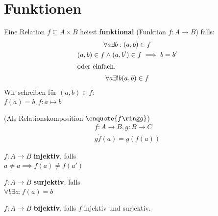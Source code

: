\section{Funktionen}
\begin{def*}[note = Funktion , index = Funktion]
	Eine Relation $f \subseteq A \times B$ heisst \textbf{funktional} (Funktion $f: A \rightarrow B$) falls:
	\begin{gather*}
		\forall a \exists b : (a,b) \in f \\
		(a,b) \in f \wedge (a,b') \in f \implies b = b' \\
		\intertext{oder einfach:}
		\forall a \exists ! b (a,b) \in f
	\end{gather*}
	Wir schreiben für $(a,b) \in f$: \\
	$f( a ) = b , f: a \mapsto b$
\end{def*}
\begin{def*}[note = Komposition , index = Komposition]
	(Als Relationskomposition $\enquote{f \ring g}$) \\
	\begin{gather*}
		f: A \rightarrow B, g: B \rightarrow C \\
		g \ring f( a ) = g( f( a ))
	\end{gather*}
\end{def*}
\begin{def*}[note = Injektivität , index = Injektivität]
	$f: A \rightarrow B$ \textbf{injektiv}, falls \\
	$a \neq a \implies f( a ) \neq f( a' )$
\end{def*}
\begin{def*}[note = Surjektivität , index = Surjektivität]
	$f: A \rightarrow B$ \textbf{surjektiv}, falls \\
	$\forall b \exists a : f( a ) = b$
\end{def*}
\begin{def*}[note = Bijektivität , index = Bijektivität]
	$f: A \rightarrow B$ \textbf{bijektiv}, falls $f$ injektiv und surjektiv.
\end{def*}

